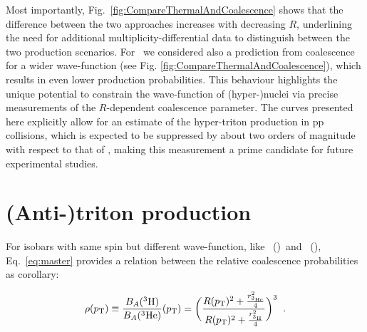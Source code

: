 \documentclass[%
 reprint,
 amsmath,amssymb,
 aps,
]{revtex4-1}
\begin{document}
Most importantly, Fig.~\ref{fig:CompareThermalAndCoalescence} shows that the difference between the two approaches increases with decreasing $R$, underlining the need for additional multiplicity-differential data to distinguish between the two production scenarios. 
For \hthreelambda~we considered also a prediction from coalescence for a wider wave-function (see Fig. \ref{fig:CompareThermalAndCoalescence}), which results in even lower production probabilities. This behaviour highlights the unique potential to constrain the wave-function of (hyper-)nuclei via precise measurements of the $R$-dependent coalescence parameter. 
The curves presented here explicitly allow for an estimate of the hyper-triton production in pp collisions, which is expected to be suppressed by about two orders of magnitude with respect to that of \hethree, making this measurement a prime candidate for future experimental studies.

\section{(Anti-)triton production}
For isobars with same spin but different wave-function, like \tritium~(\antitritium)~and \hethree~(\antihethree), Eq.~\ref{eq:master} provides a relation between the relative coalescence probabilities as corollary:

\begin{equation} \label{eq:rho}
\rho (p_{\mathrm{T}}) \equiv \frac{B_{A}({}^{3}\mathrm{H})}{B_{A}({}^{3}\mathrm{He})}(p_{\mathrm{T}}) = \bigg( \frac{R(p_{\mathrm{T}})^{2} + \frac{r_{{}^{3}\mathrm{He}}^{2}}{4}} {R(p_{\mathrm{T}})^{2} + \frac{r_{{}^{3}\mathrm{H}}^{2}}{4}} \bigg)^{3} \;\; .
\end{equation}
\end{document}
